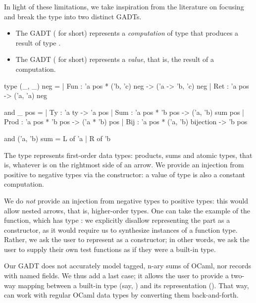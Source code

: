 In light of these limitations, we take inspiration from the literature on
focusing and break the  type into two distinct GADTs.
\begin{itemize}
  \item The GADT  ( for short) represents a
    \emph{computation} of type  that produces a result of type
    .
  \item The GADT  ( for short) represents a
    \emph{value}, that is, the result of a computation.
\end{itemize}
%
\begin{ocamlcode}
type (_, _) neg =
| Fun : 'a pos * ('b, 'c) neg -> ('a -> 'b, 'c) neg
| Ret : 'a pos -> ('a, 'a) neg

and _ pos =
| Ty : 'a ty -> 'a pos
| Sum : 'a pos * 'b pos -> ('a, 'b) sum pos
| Prod : 'a pos  * 'b pos -> ('a * 'b) pos
| Bij : 'a pos * ('a, 'b) bijection -> 'b pos

and ('a, 'b) sum = L of 'a | R of 'b
\end{ocamlcode}
%
The  type represents first-order data types: products, sums and atomic
types, that is, whatever is on the rightmost side of an arrow. We provide an
injection from positive to negative types via the  constructor: a
value of type  is also a constant computation.

We do \emph{not} provide an injection from negative types to positive types:
this would allow nested arrows, that is, higher-order types.  One can take the
example of the  function, which has type : we explicitly disallow
representing the  part as a
 constructor, as it would require us to synthesize instances of a
function type.
Rather, we ask the user to represent  as a  constructor;
in other words, we ask the user to supply their own test functions as if they
were a built-in type.

Our GADT does not accurately model tagged, n-ary sums of OCaml, nor records with
named fields. We thus add a last  case; it allows the user to
provide a two-way mapping between a built-in type (say, ) and
its \arti representation (). That way, \arti can work with regular
OCaml data types by converting them back-and-forth.


